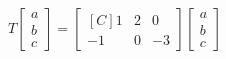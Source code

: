 \begin{exercise}
\begin{inparaenum}[a)]
\item $T\begin{bmatrix}a\\b\\c\end{bmatrix}=
\begin{bmatrix*}[C]
1 & 2 & 0\\
-1 & 0 & -3
\end{bmatrix*}
\begin{bmatrix}a \\ b \\ c \end{bmatrix}$
\end{inparaenum}
\end{exercise}

